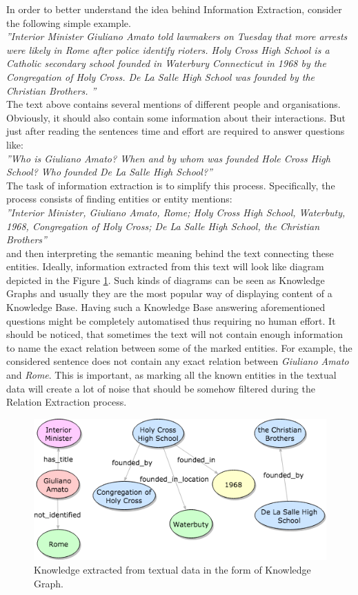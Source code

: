 In order to better understand the idea behind Information Extraction, consider the following simple example.
\\\textit{''Interior Minister Giuliano Amato told lawmakers on Tuesday that more arrests were likely in Rome after police identify rioters. Holy Cross High School is a Catholic secondary school founded in Waterbury Connecticut in 1968 by the Congregation of Holy Cross. De La Salle High School was founded by the Christian Brothers. ''}
\\The text above contains several mentions of different people and organisations. Obviously, it should also contain 
 some information about their interactions. But just after reading the sentences time 
and effort are required to answer questions like:
\\\textit{''Who is Giuliano Amato? When and by whom was founded Hole Cross High School? Who founded De La Salle High School?''}
\\The task of information extraction is to simplify this process. Specifically, the process consists of 
finding entities or entity mentions:
\\\textit{''Interior Minister, Giuliano Amato, Rome; Holy Cross High School, Waterbuty, 1968, Congregation of Holy Cross; De La Salle High School, the Christian Brothers''}
\\and then interpreting the semantic meaning behind the text connecting these entities. Ideally, 
information extracted from this text will look like diagram depicted in the Figure 
\ref{fig:knowledge-graph}. Such kinds of diagrams can be seen as Knowledge Graphs and 
usually they are the most popular way of displaying content of a Knowledge Base. Having such 
a Knowledge Base answering aforementioned questions might be completely 
automatised thus requiring no human effort. It should be noticed, that 
sometimes the text will not contain enough information to name the exact relation between 
some of the marked entities. For example, the considered sentence does not contain any exact relation
between \textit{Giuliano Amato} and \textit{Rome}. This is important, as marking all 
the known entities in the textual data will create a lot of noise that should be somehow 
filtered during the Relation Extraction process.

	\begin{figure}
		\centering
		\includegraphics[width=0.8\linewidth]{chapter1_introduction/images/knowledge-graph}
		\caption[Example of Knowledge Graph]{Knowledge extracted from textual data in the form of Knowledge Graph.}
		\label{fig:knowledge-graph}
	\end{figure}


